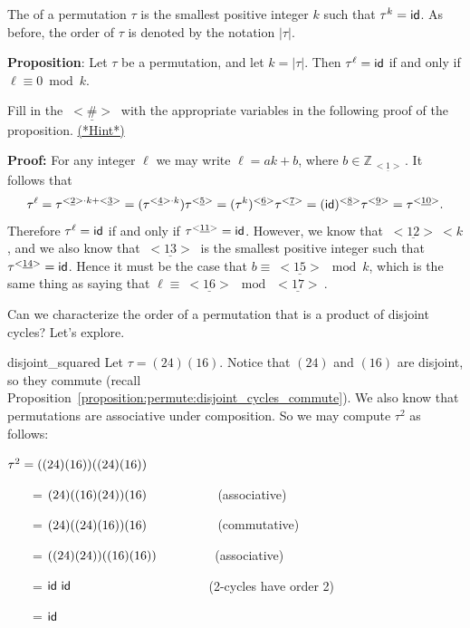 \begin{defn}
The  of a permutation $\tau$ is the smallest positive integer $k$ such that $\tau^k = {\sf{i}d}$.   As before, the order of $\tau$ is denoted by the notation $|\tau|$. 
\end{defn}



\noindent
{\bf Proposition}: Let $\tau$ be a permutation, and let $k = |\tau|$. Then $\tau^{\ell} = {\sf{i}d}$ if and only if $\ell \equiv 0 \bmod{k}$.
\medskip

\begin{exercise}{64}
Fill in the $\underline{~<\#>~}$ with the appropriate variables in the following proof of the proposition.
\hyperref[sec:permute:hints]{(*Hint*)}
\medskip

\noindent
{\bf Proof:} For any integer $\ell$ we may write $\ell = ak + b$, where $b \in \mathbb{Z}_{\underline{~<1>~}} $. It follows that
\[ \tau^{\ell} = \tau^{<\underline{2}> \cdot k + <\underline{3}>} = (\tau^{<\underline{4}> \cdot k})\tau^{<\underline{5}>} =   (\tau^k)^{<\underline{6}>}\tau^{<\underline{7}>} = ({\sf{i}d})^{<\underline{8}>}\tau^{<\underline{9}>} = \tau^{<\underline{10}>} . \]
Therefore $\tau^{\ell} = {\sf{i}d}$ if and only if $\tau^{<\underline{11}>} = {\sf{i}d}$. However, we know that $\underline{~<12>~} < k$, and we also know that $\underline{~<13>~}$ is the smallest positive integer such that  $\tau^{<\underline{14}>} = {\sf{i}d}$. Hence it must be the case that $b \equiv \underline{~<15>~} \bmod{k}$, which is the same thing as saying that  $\ell \equiv \underline{~<16>~} \bmod{\underline{~<17>~}}$.
\end{exercise}


Can we characterize the order of a permutation that is a product of disjoint cycles?  Let's explore.

\begin{example}{disjoint_squared}
Let $\tau = (2 4)(1 6).$ Notice that $(2 4)$ and $(1 6)$ are disjoint, so they commute (recall Proposition~\ref{proposition:permute:disjoint_cycles_commute}). We also know that permutations are associative under composition. So we may compute $\tau^2$ as follows:

\noindent
$\tau^2 = {\large(} (2 4 )(1 6 ) {\large )} {\large(} (2 4 )(1 6 ) {\large )}$
 
~~~~=  $(2 4) {\large(} (1 6) (2 4 ) {\large )} (1 6 )$~~~~~~~~~~~(associative) 

~~~~=  $(2 4 ) {\large(} (2 4 ) (1 6)  {\large )} (1 6 )$~~~~~~~~~~~(commutative) 

~~~~=  ${\large(}  (2 4 ) (2 4 ) {\large )} {\large(}  (1 6) (1 6 ) {\large )}$~~~~~~~~~(associative) 

~~~~=  ${\sf{i}d}~{\sf{i}d}$ ~~~~~~~~~~~~~~~~~~~~~(2-cycles have order 2) 

~~~~=  ${\sf{i}d}$   

\end{example}


